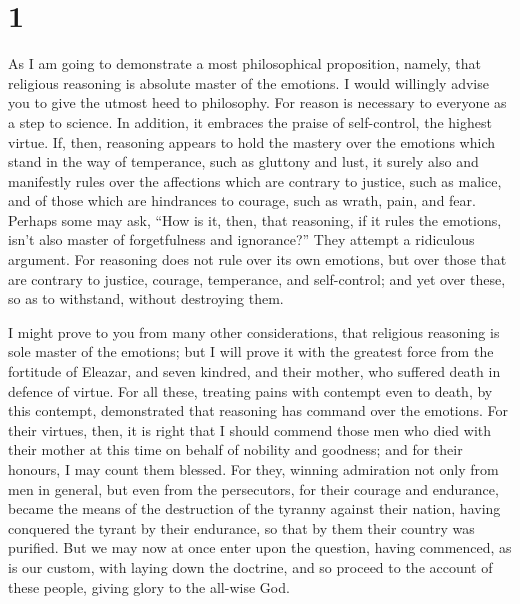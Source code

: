 \hypertarget{section}{%
\section{1}\label{section}}

 As I am going to demonstrate a most philosophical
proposition, namely, that religious reasoning is absolute master of the
emotions. I would willingly advise you to give the utmost heed to
philosophy.  For reason is necessary to everyone as a step
to science. In addition, it embraces the praise of self-control, the
highest virtue.  If, then, reasoning appears to hold the
mastery over the emotions which stand in the way of temperance, such as
gluttony and lust,  it surely also and manifestly rules over
the affections which are contrary to justice, such as malice, and of
those which are hindrances to courage, such as wrath, pain, and fear.
 Perhaps some may ask, ``How is it, then, that reasoning, if
it rules the emotions, isn't also master of forgetfulness and
ignorance?'' They attempt a ridiculous argument.  For
reasoning does not rule over its own emotions, but over those that are
contrary to justice, courage, temperance, and self-control; and yet over
these, so as to withstand, without destroying them.

 I might prove to you from many other considerations, that
religious reasoning is sole master of the emotions;  but I
will prove it with the greatest force from the fortitude of Eleazar, and
seven kindred, and their mother, who suffered death in defence of
virtue.  For all these, treating pains with contempt even to
death, by this contempt, demonstrated that reasoning has command over
the emotions.  For their virtues, then, it is right that I
should commend those men who died with their mother at this time on
behalf of nobility and goodness; and for their honours, I may count them
blessed.  For they, winning admiration not only from men in
general, but even from the persecutors, for their courage and endurance,
became the means of the destruction of the tyranny against their nation,
having conquered the tyrant by their endurance, so that by them their
country was purified.  But we may now at once enter upon
the question, having commenced, as is our custom, with laying down the
doctrine, and so proceed to the account of these people, giving glory to
the all-wise God.

